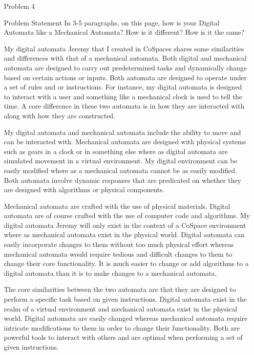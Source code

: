 \begin{problem}{Problem 4}
    \begin{statement}{Problem Statement}
        In 3-5 paragraphs, on this page, how is your Digital Automata like a Mechanical Automata? How is it different? How is it the same?
    \end{statement}

    \begin{Highlight}[Response]
        My digital automata Jeremy that I created in CoSpaces shares some similarities and differences with that of a mechanical automata. Both digital and mechanical automata are designed to carry out predetermined tasks
        and dynamically change based on certain actions or inputs. Both automata are designed to operate under a set of rules and or instructions. For instance, my digital automata is designed to interact with a user and 
        something like a mechanical clock is used to tell the time. A core difference in these two automata is in how they are interacted with along with how they are constructed.

        My digital automata and mechanical automata include the ability to move and can be interacted with. Mechanical automata are designed with physical systems such as gears in a clock or in something else where as digital
        automata are simulated movement in a virtual environment. My digital environment can be easily modified where as a mechanical automata cannot be as easily modified. Both automata involve dynamic responses that are
        predicated on whether they are designed with algorithms or physical components.

        Mechanical automata are crafted with the use of physical materials. Digital automata are of course crafted with the use of computer code and algorithms. My digital automata Jeremy will only exist in the context of
        a CoSpace environment where as mechanical automata exist in the physical world. Digital automata can easily incorporate changes to them without too much physical effort whereas mechanical automata would require tedious
        and difficult changes to them to change their core functionality. It is much easier to change or add algorithms to a digital automata than it is to make changes to a mechanical automata.

        The core similarities between the two automata are that they are designed to perform a specific task based on given instructions. Digital automata exist in the realm of a virtual environment and mechanical automata exist
        in the physical world. Digital automata are easily changed whereas mechanical automata require intricate modifications to them in order to change their functionality. Both are powerful tools to interact with others and 
        are optimal when performing a set of given instructions.
    \end{Highlight}
\end{problem}

